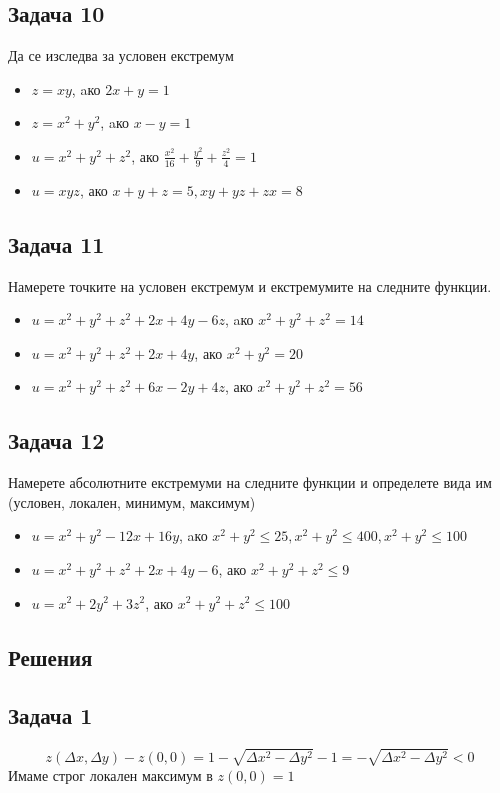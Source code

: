 \documentclass[a4paper,fleqn,12pt]{article}
\theoremstyle{definition}
\begin{document}
\subsection*{Задача 10}
Да се изследва за условен екстремум
\begin{itemize}
\item $z = xy$, aко $2x+y=1$
\item $z = x^2 + y^2$, aко $x - y =1$
\item $u = x^2 + y^2 + z^2$, ако $\frac{x^2}{16} + \frac{y^2}{9} + \frac{z^2}{4} = 1$
\item $u = xyz$, ако $x + y + z = 5, xy+yz+zx = 8$ 
\end{itemize}

\subsection*{Задача 11}
Намерете точките на условен екстремум и екстремумите на следните функции.
\begin{itemize}
\item $u = x^2 + y^2+ z^2 +2x + 4y -6z $, aко $ x^2 + y^2+ z^2 = 14$
\item $u = x^2 + y^2 + z^2 + 2x + 4y $, ако $x^2 + y^2 = 20$
\item $u = x^2 + y^2+ z^2 +6x - 2y + 4z $, ако $x^2 + y^2+ z^2 = 56$ 
\end{itemize}

\subsection*{Задача 12}
Намерете абсолютните екстремуми на следните функции и определете вида им (условен, локален, минимум, максимум)
\begin{itemize}
\item $u = x^2 + y^2 - 12x + 16y$, aко $ x^2 + y^2 \leq 25, x^2 + y^2 \leq 400, x^2 + y^2 \leq 100$
\item $u = x^2 + y^2+ z^2 +2x + 4y -6 $, ако $x^2 + y^2 + z^2 \leq 9$
\item $u = x^2 + 2y^2+ 3z^2$, ако $x^2 + y^2+ z^2 \leq 100$ 
\end{itemize}

\newpage
\subsection{Решения}
\subsection*{Задача 1}
$$z(\Delta x, \Delta y) - z(0,0) = 1-\sqrt{\Delta x^2 - \Delta y^2} - 1 = -\sqrt{\Delta x^2 - \Delta y^2}< 0$$
Имаме строг локален максимум в $z(0,0) = 1$
\end{document}
